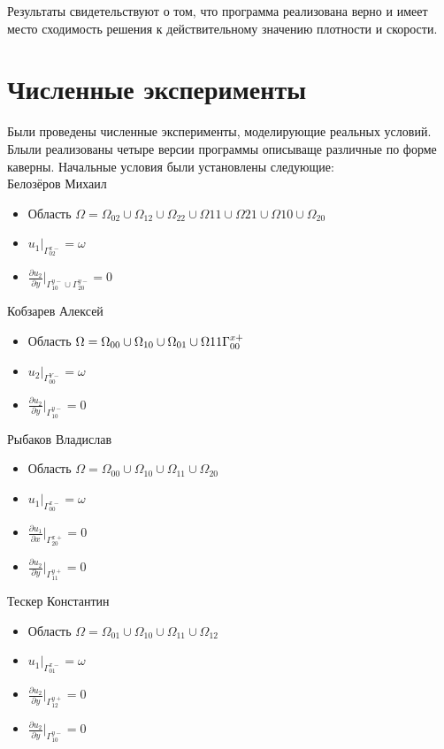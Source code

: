 \documentclass[a4paper, 25pt]{article}
\begin{document}
Результаты свидетельствуют о том, что программа реализована верно и имеет место сходимость решения к действительному значению плотности и скорости.
\newpage

\section {Численные эксперименты}

Были проведены численные эксперименты, моделирующие реальных условий.
Блыли реализованы четыре версии программы описываще различные по форме каверны.
Начальные условия были установлены следующие:\\
Белозёров Михаил
\begin {itemize}
\item Область $\Omega = \Omega_{02} \cup \Omega_{12} \cup \Omega_{22} \cup \Omega{11} \cup \Omega{21} \cup \Omega{10} \cup \Omega_{20}$
  \item $u_1|_{\Gamma_{02}^{x-}} = \omega$
  \item $\frac{{\partial}u_2}{{\partial}y}|_{\Gamma_{10}^{y-}\cup\Gamma_{20}^{y-}} = 0$
  \end   {itemize}
Кобзарев Алексей
\begin {itemize}
\item Область $\Omega = \Omega_{00} \cup \Omega_{10} \cup \Omega_{01} \cup \Omega{11} \\ \Gamma^{x+}_{00}$
  \item $u_2|_{\Gamma_{00}^{Y-}} = \omega$
  \item $\frac{{\partial}u_2}{{\partial}y}|_{\Gamma_{10}^{y-}} = 0$
\end   {itemize}
Рыбаков Владислав
\begin {itemize}
  \item Область $\Omega = \Omega_{00}\cup\Omega_{10}\cup\Omega_{11}\cup\Omega_{20}$
  \item $u_1|_{\Gamma_{00}^{x-}} = \omega$
  \item $\frac{{\partial}u_1}{{\partial}x}|_{\Gamma_{20}^{x+}} = 0$
  \item $\frac{{\partial}u_2}{{\partial}y}|_{\Gamma_{11}^{y+}} = 0$
\end   {itemize}
Тескер Константин
\begin {itemize}
  \item Область $\Omega = \Omega_{01}\cup\Omega_{10}\cup\Omega_{11}\cup\Omega_{12}$
  \item $u_1|_{\Gamma_{01}^{x-}} = \omega$
  \item $\frac{{\partial}u_2}{{\partial}y}|_{\Gamma_{12}^{y+}} = 0$
  \item $\frac{{\partial}u_2}{{\partial}y}|_{\Gamma_{10}^{y-}} = 0$
\end   {itemize}
\end{document}
